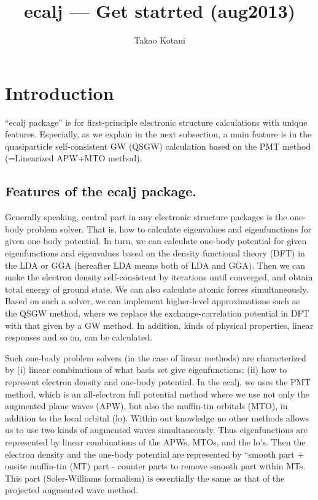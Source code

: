 \documentclass[a4paper,10pt,epsf,fleqn]{article}
\author{Takao Kotani}
\title{ecalj --- Get statrted (aug2013)}
\begin{document}
\maketitle
\tableofcontents
\newpage
\section{Introduction}
``ecalj package'' is for first-principle electronic structure
calculations with unique features. 
Especially, as we explain in the next subsection,
a main feature is in the quasiparticle self-consistent GW (QSGW)
calculation based on the PMT method (=Linearized APW+MTO method).

\subsection{Features of the ecalj package.}
Generally speaking, central part in any electronic structure
packages is the one-body problem solver. 
That is, how to calculate eigenvalues and eigenfunctions for given one-body
potential. In turn, we can calculate one-body potential 
for given eigenfunctions and eigenvalues
based on the density functional theory (DFT) in the LDA or GGA
(hereafter LDA means both of LDA and GGA).
Then we can make the electron density self-consistent by iterations
until converged, and obtain total energy of ground state.
We can also calculate atomic forces simultaneously.
Based on such a solver, we can implement 
higher-level approximations such as the QSGW method, where we replace
the exchange-correlation potential in DFT with that given by a GW method.
In addition, kinds of physical properties, linear responses and so on, 
can be calculated.

Such one-body problem solvers (in the case of linear methods) are
characterized by (i) linear combinations of what basis set give eigenfunctions; 
(ii) how to represent electron density and one-body potential.
In the ecalj, we uses the PMT method, which is an
all-electron full potential method where we use not only the
augmented plane waves (APW), but also the muffin-tin orbitals (MTO),
in addition to the local orbital (lo). Within out knowledge no other
methods allows us to use two kinds of augmented waves simultaneously.
Thus eigenfunctions are represented by linear combinations of the
APWs, MTOs, and the lo's.
Then the electron density and the one-body potential are represented
by ``smooth part + onsite muffin-tin (MT) part - counter parts to
remove smooth part within MTs.
This part (Soler-Williams formalism) is essentially 
the same as that of the projected augmented wave method.
\end{document}
